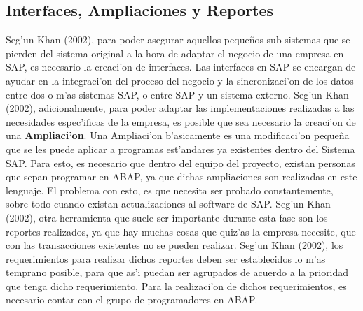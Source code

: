 \subsection{Interfaces, Ampliaciones y Reportes}

	Seg'un Khan (2002), para poder asegurar aquellos peque\~nos sub-sistemas que se pierden del sistema original a la hora de adaptar el negocio de una empresa en SAP, es necesario la creaci'on de interfaces. Las interfaces en SAP se encargan de ayudar en la integraci'on del proceso del negocio y la sincronizaci'on de los datos entre dos o m'as sistemas SAP, o entre SAP y un sistema externo.
\newline
\newline
\indent Seg'un Khan (2002), adicionalmente, para poder adaptar las implementaciones realizadas a las necesidades espec'ificas de la empresa, es posible que sea necesario la creaci'on de una \textbf{Ampliaci'on}. Una Ampliaci'on b'asicamente es una modificaci'on peque\~na que se les puede aplicar a programas est'andares ya existentes dentro del Sistema SAP. Para esto, es necesario que dentro del equipo del proyecto, existan personas que sepan programar en ABAP, ya que dichas ampliaciones son realizadas en este lenguaje. El problema con esto, es que necesita ser probado constantemente, sobre todo cuando existan actualizaciones al software de SAP. 
\newline
\newline
\indent Seg'un Khan (2002), otra herramienta que suele ser importante durante esta fase son los reportes realizados, ya que hay muchas cosas que quiz'as la empresa necesite, que con las transacciones existentes no se pueden realizar.
\newline
\newline
\indent Seg'un Khan (2002), los requerimientos para realizar dichos reportes deben ser establecidos lo m'as temprano posible, para que as'i puedan ser agrupados de acuerdo a la prioridad que tenga dicho requerimiento. Para la realizaci'on de dichos requerimientos, es necesario contar con el grupo de programadores en ABAP. 
	
	





